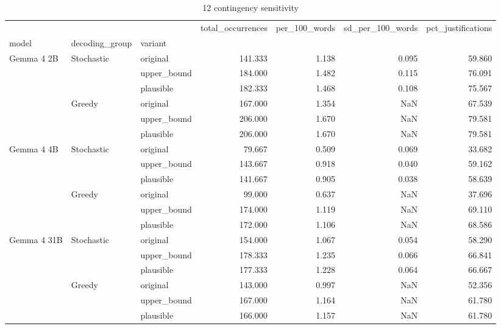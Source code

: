 \begin{table}
\caption{12 contingency sensitivity}
\begin{tabular}{lllrrrr}
\toprule
 &  &  & total\_occurrences & per\_100\_words & sd\_per\_100\_words & pct\_justifications \\
model & decoding_group & variant &  &  &  &  \\
\midrule
\multirow[t]{6}{*}{Gemma 4 2B} & \multirow[t]{3}{*}{Stochastic} & original & 141.333 & 1.138 & 0.095 & 59.860 \\
 &  & upper\_bound & 184.000 & 1.482 & 0.115 & 76.091 \\
 &  & plausible & 182.333 & 1.468 & 0.108 & 75.567 \\
\cline{2-7}
 & \multirow[t]{3}{*}{Greedy} & original & 167.000 & 1.354 & NaN & 67.539 \\
 &  & upper\_bound & 206.000 & 1.670 & NaN & 79.581 \\
 &  & plausible & 206.000 & 1.670 & NaN & 79.581 \\
\cline{1-7} \cline{2-7}
\multirow[t]{6}{*}{Gemma 4 4B} & \multirow[t]{3}{*}{Stochastic} & original & 79.667 & 0.509 & 0.069 & 33.682 \\
 &  & upper\_bound & 143.667 & 0.918 & 0.040 & 59.162 \\
 &  & plausible & 141.667 & 0.905 & 0.038 & 58.639 \\
\cline{2-7}
 & \multirow[t]{3}{*}{Greedy} & original & 99.000 & 0.637 & NaN & 37.696 \\
 &  & upper\_bound & 174.000 & 1.119 & NaN & 69.110 \\
 &  & plausible & 172.000 & 1.106 & NaN & 68.586 \\
\cline{1-7} \cline{2-7}
\multirow[t]{6}{*}{Gemma 4 31B} & \multirow[t]{3}{*}{Stochastic} & original & 154.000 & 1.067 & 0.054 & 58.290 \\
 &  & upper\_bound & 178.333 & 1.235 & 0.066 & 66.841 \\
 &  & plausible & 177.333 & 1.228 & 0.064 & 66.667 \\
\cline{2-7}
 & \multirow[t]{3}{*}{Greedy} & original & 143.000 & 0.997 & NaN & 52.356 \\
 &  & upper\_bound & 167.000 & 1.164 & NaN & 61.780 \\
 &  & plausible & 166.000 & 1.157 & NaN & 61.780 \\
\cline{1-7} \cline{2-7}
\bottomrule
\end{tabular}
\end{table}
